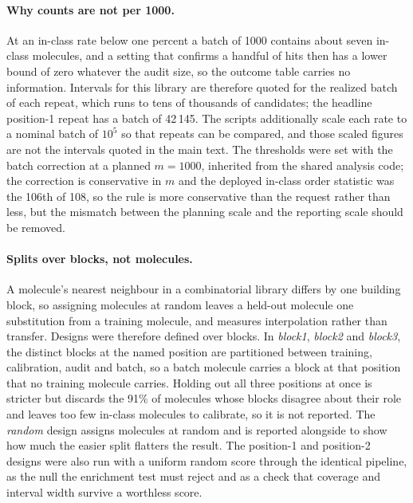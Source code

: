 \documentclass[10pt]{article}
\begin{document}
\paragraph{Why counts are not per 1000.} At an in-class rate below one percent a batch of 1000 contains about seven in-class molecules, and a setting that confirms a handful of hits then has a lower bound of zero whatever the audit size, so the outcome table carries no information. Intervals for this library are therefore quoted for the realized batch of each repeat, which runs to tens of thousands of candidates; the headline position-1 repeat has a batch of 42\,145. The scripts additionally scale each rate to a nominal batch of $10^5$ so that repeats can be compared, and those scaled figures are not the intervals quoted in the main text. The thresholds were set with the batch correction at a planned $m=1000$, inherited from the shared analysis code; the correction is conservative in $m$ and the deployed in-class order statistic was the 106th of 108, so the rule is more conservative than the request rather than less, but the mismatch between the planning scale and the reporting scale should be removed.

\paragraph{Splits over blocks, not molecules.} A molecule's nearest neighbour in a combinatorial library differs by one building block, so assigning molecules at random leaves a held-out molecule one substitution from a training molecule, and measures interpolation rather than transfer. Designs were therefore defined over blocks. In \emph{block1}, \emph{block2} and \emph{block3}, the distinct blocks at the named position are partitioned between training, calibration, audit and batch, so a batch molecule carries a block at that position that no training molecule carries. Holding out all three positions at once is stricter but discards the 91\% of molecules whose blocks disagree about their role and leaves too few in-class molecules to calibrate, so it is not reported. The \emph{random} design assigns molecules at random and is reported alongside to show how much the easier split flatters the result. The position-1 and position-2 designs were also run with a uniform random score through the identical pipeline, as the null the enrichment test must reject and as a check that coverage and interval width survive a worthless score.
\end{document}
